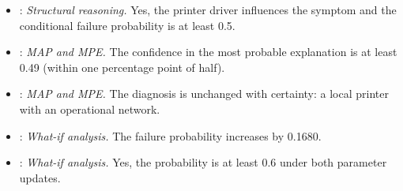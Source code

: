 \begingroup\raggedright
\begin{itemize}[nosep,leftmargin=*]
\item {}: \emph{Structural reasoning.}  Yes, the printer driver influences the symptom and the conditional failure probability is at least 0.5.
\item {}: \emph{MAP and MPE.}  The confidence in the most probable explanation is at least 0.49 (within one percentage point of half).
\item {}: \emph{MAP and MPE.}  The diagnosis is unchanged with certainty: a local printer with an operational network.
\item {}: \emph{What-if analysis.}  The failure probability increases by 0.1680.
\item {}: \emph{What-if analysis.}  Yes, the probability is at least 0.6 under both parameter updates.
\end{itemize}
\endgroup
